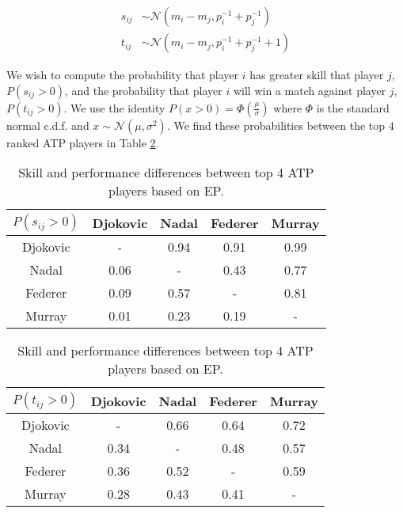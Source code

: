 \documentclass[11pt]{article}
\begin{document}
\begin{equation}
\begin{split}
    s_{ij} &\sim \mathcal{N}(m_i - m_j, p_i^{-1} + p_j^{-1}) \\
    t_{ij} &\sim \mathcal{N}(m_i - m_j, p_i^{-1} + p_j^{-1} + 1)
\end{split}
\label{eq:skill_performance_diff}
\end{equation}

We wish to compute the probability that player $i$ has greater skill that player $j$, $P(s_{ij}>0)$, and the probability that player $i$ will win a match against player $j$, $P(t_{ij}>0)$. We use the identity $P(x>0) = \Phi(\frac{\mu}{\sigma})$ where $\Phi$ is the standard normal c.d.f. and $x \sim \mathcal{N}(\mu, \sigma^2)$. We find these probabilities between the top 4 ranked ATP players in Table \ref{tbl:B_atp_probabilities}.

\begin{table}
    \centering
    \small
    \setlength{\tabcolsep}{2pt}
    \begin{minipage}{0.49\textwidth}
        \small
        \centering
        \begin{tabular}{|c|c c c c|}
            \hline
            $P(s_{ij}>0)$ & Djokovic & Nadal & Federer & Murray \\
            \hline
            Djokovic & -    & 0.94 & 0.91 & 0.99 \\
            Nadal    & 0.06 & -    & 0.43 & 0.77 \\
            Federer  & 0.09 & 0.57 & -    & 0.81 \\
            Murray   & 0.01 & 0.23 & 0.19 & -    \\
            \hline
        \end{tabular}
        \label{tbl:B_skill_difference}
    \end{minipage}
    \begin{minipage}{0.49\textwidth}
        \small
        \centering
        \begin{tabular}{|c|c c c c|}
            \hline
            $P(t_{ij}>0)$ & Djokovic & Nadal & Federer & Murray \\
            \hline
            Djokovic & -    & 0.66 & 0.64 & 0.72 \\ 
            Nadal    & 0.34 & -    & 0.48 & 0.57 \\ 
            Federer  & 0.36 & 0.52 & -    & 0.59 \\ 
            Murray   & 0.28 & 0.43 & 0.41 & -    \\
            \hline
        \end{tabular}
        \label{tbl:B_performance_difference}
    \end{minipage}
    \caption{Skill and performance differences between top 4 ATP players based on EP.}
    \label{tbl:B_atp_probabilities}
\end{table}
\end{document}
